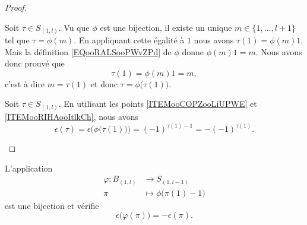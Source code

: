 \begin{proof}
\begin{subproof}
		Soit \( \tau\in S_{(1,l)}\). Vu que \( \phi\) est une bijection, il existe un unique \( m\in \{ 1,\ldots,l+1 \}\) tel que \( \tau=\phi(m)\). En appliquant cette égalité à \( 1\) nous avons \( \tau(1)=\phi(m)1\). Mais la définition \eqref{EQooRALSooPWvZPd} de \( \phi\) donne \( \phi(m)1=m\). Nous avons donc prouvé que
		\begin{equation}
			\tau(1)=\phi(m)1=m,
		\end{equation}
		c'est à dire \( m=\tau(1)\) et donc \( \tau=\phi\big( \tau(1) \big)\).

		Soit \( \tau\in S_{(1,l)}\). En utilisant les points \ref{ITEMooCOPZooLiUPWE} et \ref{ITEMooRIHAooItlkCh}, nous avons
		\begin{equation}
			\epsilon(\tau)=\epsilon\Big( \phi\big( \tau(1) \big) \Big)=(-1)^{\tau(1)-1}=-(-1)^{\tau(1)}.
		\end{equation}
	\end{subproof}
\end{proof}

\begin{lemma}		\label{LEMooFHCHooQgrwHD}
	L'application
	\begin{equation}
		\begin{aligned}
			\varphi\colon B_{(1,l)} & \to S_{(1,l-1)}                  \\
			\pi                     & \mapsto \phi\big( \pi(1)-1 \big)
		\end{aligned}
	\end{equation}
	est une bijection et vérifie
	\begin{equation}
		\epsilon\big( \varphi(\pi) \big)=-\epsilon(\pi).
	\end{equation}
\end{lemma}

